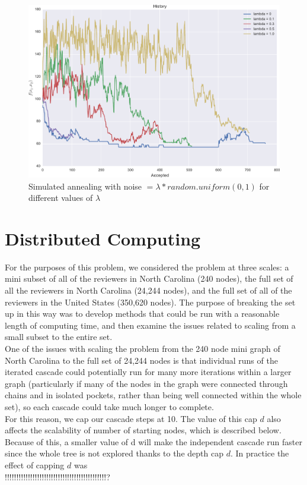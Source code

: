 \documentclass[11pt]{scrartcl} %
\begin{document}
\begin{figure}
\centering
\includegraphics[width=10 cm]{lambda01}
\caption{Simulated annealing with noise $= \lambda*random.uniform(0,1)$ for different values of $\lambda$}
\label{fig:SA}
\end{figure}
	 
\section{Distributed Computing}

For the purposes of this problem, we considered the problem at three scales: a mini subset of all of the reviewers in North Carolina (240 nodes), the full set of all the reviewers in North Carolina (24,244 nodes), and the full set of all of the reviewers in the United States (350,620 nodes).  The purpose of breaking the set up in this way was to develop methods that could be run with a reasonable length of computing time, and then examine the issues related to scaling from a small subset to the entire set.  \\

One of the issues with scaling the problem from the 240 node mini graph of North Carolina to the full set of 24,244 nodes is that individual runs of the iterated cascade could potentially run for many more iterations within a larger graph (particularly if many of the nodes in the graph were connected through chains and in isolated pockets, rather than being well connected within the whole set), so each cascade could take much longer to complete.  \\

For this reason, we cap our cascade steps at 10.  The value of this cap $d$ also affects the scalability of number of starting nodes, which is described below.  Because of this, a smaller value of d will make the independent cascade run faster since the whole tree is not explored thanks to the depth cap $d$. In practice the effect of capping $d$ was\\
 !!!!!!!!!!!!!!!!!!!!!!!!!!!!!!!!!!!!!!!!!!!!?\\
\end{document}
